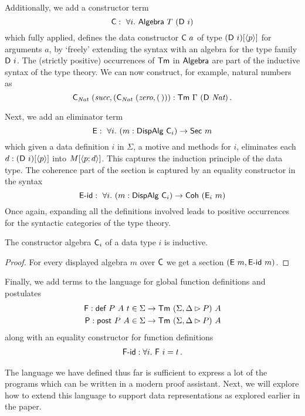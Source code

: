 Additionally, we add a constructor term
\[
	\mta{C} :\ \forall i.\ \mta{Algebra}\ T\ (\mta{D}\ i)
\]
which fully applied, defines the data constructor $\textsf{C}\ a$ of type
$(\textsf{D}\ i)[\langle p\rangle]$ for arguments $a$, by `freely' extending the syntax with
an algebra for the type family $\textsf{D}\ i$. The (strictly positive) occurrences
of $\textsf{Tm}$ in $\textsf{Algebra}$ are part of the inductive syntax of the type
theory. We can now construct, for example, natural numbers as
\[
    \mta{C}_{\textit{Nat}}\ (\textit{succ}, (\mta{C}_{\textit{Nat}}\ (\textit{zero}, (\,))) : \mta{Tm}\ \Gamma\ (\mta{D}\ \textit{Nat}) \,.
\]

Next, we add an eliminator term
\[
	\textsf{E} :\ \forall i.\ (m : \textsf{DispAlg}\ \textsf{C}_i) \to \textsf{Sec}\ m
\]
which given a data definition $i$ in $\Sigma$, a motive and methods for $i$,
eliminates each $d : (\textsf{D}\ i)[\langle p\rangle]$ into $M[\langle p;d\rangle]$. This captures
the induction principle of the data type. The coherence part of the section is
captured by an equality constructor in the syntax
\[
	\mta{E-id} :\ \forall i.\ (m : \mta{DispAlg}\ \mta{C}_i) \to \mta{Coh}\ (\mta{E}_i\ m)
\]
Once again, expanding all the definitions involved leads to positive occurrences for
the syntactic categories of the type theory.
\begin{lemma}
	The constructor algebra $\textsf{C}_i$ of a data type $i$ is inductive.
	\begin{proof}
		For every displayed algebra $m$ over $\textsf{C}$ we get a section $(\textsf{E}\ m, \textsf{E-id}\ m)$.
	\end{proof}
\end{lemma}

Finally, we add terms to the language for global function definitions and postulates
\begin{align*}
	\textsf{F} : \textsf{def}\ P\ A\ t \in \Sigma \to \textsf{Tm}\ (\Sigma, \Delta \rhd P)\ A \\
	\textsf{P} : \textsf{post}\ P\ A \in \Sigma \to \textsf{Tm}\ (\Sigma, \Delta \rhd P)\ A
\end{align*}
along with an equality constructor for function definitions
\begin{align*}
	\textsf{F-id} : \forall i.\ \textsf{F}\ i = t \,.
\end{align*}

The language we have defined thus far is sufficient to express a lot of the
programs which can be written in a modern proof assistant. Next, we will explore
how to extend this language to support data representations as explored earlier
in the paper.

